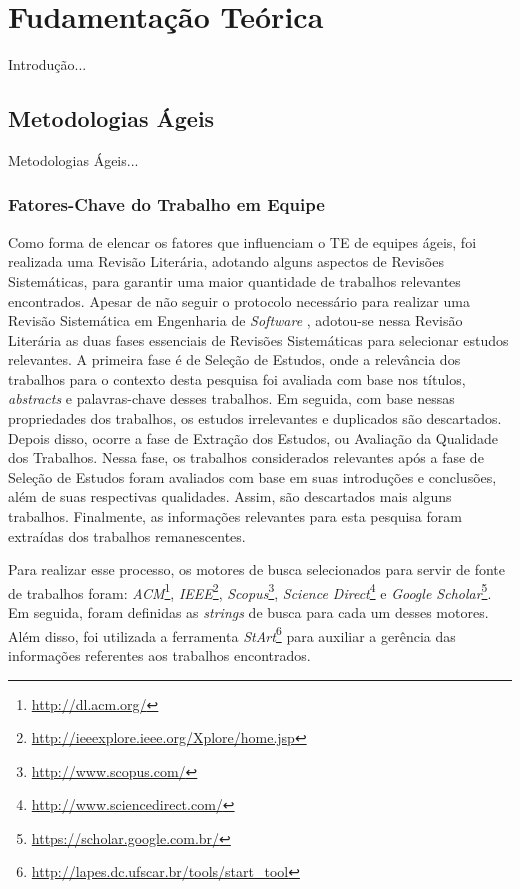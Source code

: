 \chapter{Fudamentação Teórica}
\label{fundamentacao}

{\color{red} Introdução...}

\section{Metodologias Ágeis}
\label{fundamentacao:ageis}

{\color{red} Metodologias Ágeis...}

\subsection{Fatores-Chave do Trabalho em Equipe}
\label{fundamentacao:ageis:fatores}

Como forma de elencar os fatores que influenciam o TE de equipes ágeis, foi realizada uma Revisão Literária, adotando alguns aspectos de Revisões Sistemáticas, para garantir uma maior quantidade de trabalhos relevantes encontrados. Apesar de não seguir o protocolo necessário para realizar uma Revisão Sistemática em Engenharia de \textit{Software} \cite{kitchenhan}, adotou-se nessa Revisão Literária as duas fases essenciais de Revisões Sistemáticas para selecionar estudos relevantes. A primeira fase é de Seleção de Estudos, onde a relevância dos trabalhos para o contexto desta pesquisa foi avaliada com base nos títulos, \textit{abstracts} e palavras-chave desses trabalhos. Em seguida, com base nessas propriedades dos trabalhos, os estudos irrelevantes e duplicados são descartados. Depois disso, ocorre a fase de Extração dos Estudos, ou Avaliação da Qualidade dos Trabalhos. Nessa fase, os trabalhos considerados relevantes após a fase de Seleção de Estudos foram avaliados com base em suas introduções e conclusões, além de suas respectivas qualidades. Assim, são descartados mais alguns trabalhos. Finalmente, as informações relevantes para esta pesquisa foram extraídas dos trabalhos remanescentes.

Para realizar esse processo, os motores de busca selecionados para servir de fonte de trabalhos foram: \textit{ACM}\footnote{\url{http://dl.acm.org/}}, \textit{IEEE}\footnote{\url{http://ieeexplore.ieee.org/Xplore/home.jsp}}, \textit{Scopus}\footnote{\url{http://www.scopus.com/}}, \textit{Science Direct}\footnote{\url{http://www.sciencedirect.com/}} e \textit{Google Scholar}\footnote{\url{https://scholar.google.com.br/}}. Em seguida, foram definidas as \textit{strings} de busca para cada um desses motores. Além disso, foi utilizada a ferramenta \textit{StArt}\footnote{\url{http://lapes.dc.ufscar.br/tools/start_tool}} para auxiliar a gerência das informações referentes aos trabalhos encontrados.

